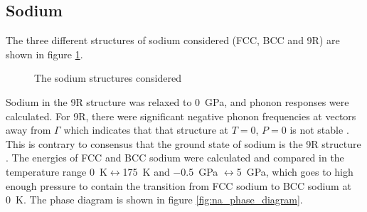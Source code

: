 \documentclass[12pt]{article}
\begin{document}
\subsection{Sodium}
The three different structures of sodium considered (FCC, BCC and 9R) are shown in figure \ref{fig:sodium_structures}.
\begin{figure}
	\centering
	\qquad
	\qquad
	\qquad
	\caption{The sodium structures considered}
	\label{fig:sodium_structures}
\end{figure}
Sodium in the 9R structure was relaxed to \SI{0}{\giga\pascal}, and phonon responses were calculated. For 9R, there were significant negative phonon frequencies at vectors away from $\Gamma$ which indicates that that structure at $T=0$, $P=0$ is not stable \cite{wallace1998thermodynamics}. 
This is contrary to consensus that the ground state of sodium is the 9R structure \cite{neaton2001constitution}\cite{degtyareva2009structure}\cite{ackland2017quantum}.
The energies of FCC and BCC sodium were calculated and compared in the temperature range \SI{0}{\kelvin}$\leftrightarrow$\SI{175}{\kelvin} and \SI{-0.5}{\giga\pascal} $\leftrightarrow $\SI{5}{\giga\pascal}, which goes to high enough pressure to contain the transition from FCC sodium to BCC sodium at \SI{0}{\kelvin}. 
The phase diagram is shown in figure \ref{fig:na_phase_diagram}.
\end{document}
